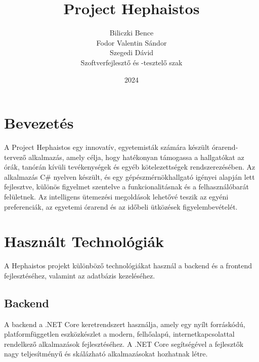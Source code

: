 \documentclass[colorlinks]{thesis-kando}
\theoremstyle{definition}
\theoremstyle{remark}
\begin{document}
\title{Project Hephaistos}

\author{Biliczki Bence\\Fodor Valentin Sándor\\Szegedi Dávid\\Szoftverfejlesztő és -tesztelő szak}

\date{2024}
\begin{figure}[h]
	\centering
	\label{fig:minta}
\end{figure}
\maketitle

\tableofcontents

\pagebreak

\section*{Bevezetés} 

A Project Hephaistos egy innovatív, egyetemisták számára készült órarend-tervező alkalmazás, amely célja, hogy hatékonyan támogassa a hallgatókat az órák, tanórán kívüli tevékenységek és egyéb kötelezettségek rendszerezésében. Az alkalmazás C# nyelven készült, és egy gépészmérnökhallgató igényei alapján lett fejlesztve, különös figyelmet szentelve a funkcionalitásnak és a felhasználóbarát felületnek. Az intelligens ütemezési megoldások lehetővé teszik az egyéni preferenciák, az egyetemi órarend és az időbeli ütközések figyelembevételét.

\section{Használt Technológiák}
A Hephaistos projekt különböző technológiákat használ a backend és a frontend fejlesztéséhez, valamint az adatbázis kezeléséhez.

\subsection{Backend}
A backend a .NET Core keretrendszert használja, amely egy nyílt forráskódú, platformfüggetlen eszközkészlet a modern, felhőalapú, internetkapcsolattal rendelkező alkalmazások fejlesztéséhez. A .NET Core segítségével a fejlesztők nagy teljesítményű és skálázható alkalmazásokat hozhatnak létre.
\end{document}
